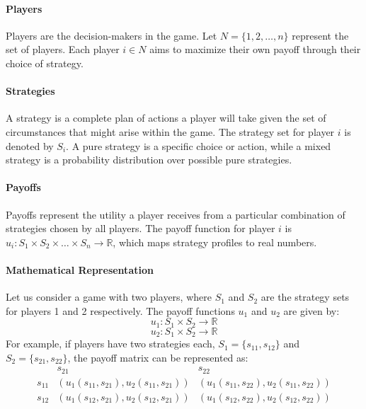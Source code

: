 \documentclass[12pt]{book} %
\begin{document}
\paragraph{Players}
Players are the decision-makers in the game. Let \( N = \{1, 2, \ldots, n\} \) represent the set of players. Each player \( i \in N \) aims to maximize their own payoff through their choice of strategy.

\paragraph{Strategies}
A strategy is a complete plan of actions a player will take given the set of circumstances that might arise within the game. The strategy set for player \( i \) is denoted by \( S_i \). A pure strategy is a specific choice or action, while a mixed strategy is a probability distribution over possible pure strategies.

\paragraph{Payoffs}
Payoffs represent the utility a player receives from a particular combination of strategies chosen by all players. The payoff function for player \( i \) is \( u_i: S_1 \times S_2 \times \ldots \times S_n \rightarrow \mathbb{R} \), which maps strategy profiles to real numbers.

\paragraph{Mathematical Representation}
Let us consider a game with two players, where \( S_1 \) and \( S_2 \) are the strategy sets for players 1 and 2 respectively. The payoff functions \( u_1 \) and \( u_2 \) are given by:
\[
u_1: S_1 \times S_2 \rightarrow \mathbb{R}
\]
\[
u_2: S_1 \times S_2 \rightarrow \mathbb{R}
\]
For example, if players have two strategies each, \( S_1 = \{s_{11}, s_{12}\} \) and \( S_2 = \{s_{21}, s_{22}\} \), the payoff matrix can be represented as:
\[
\begin{array}{c|c|c}
 & s_{21} & s_{22} \\
\hline
s_{11} & (u_1(s_{11}, s_{21}), u_2(s_{11}, s_{21})) & (u_1(s_{11}, s_{22}), u_2(s_{11}, s_{22})) \\
\hline
s_{12} & (u_1(s_{12}, s_{21}), u_2(s_{12}, s_{21})) & (u_1(s_{12}, s_{22}), u_2(s_{12}, s_{22})) \\
\end{array}
\]
\end{document}
